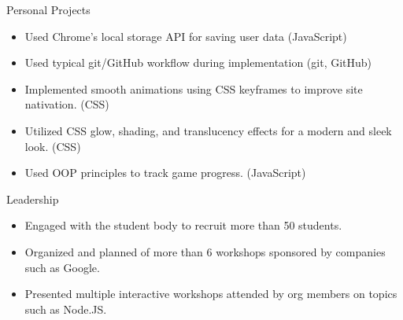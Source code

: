\documentclass{resume} %
\begin{document}
\begin{workSection}{Personal Projects}
    \customItem[
        title=To Do List Webapp,
        duration=Fall 2022,
        keyHighlight=Developed interactive to-do list webapp with local save function through vanilla HTML{,} CSS \& JS
    ]
    \begin{itemize}
        \vspace{-0.5em}
        \itemsep -6pt {}
        \item Used Chrome's local storage API for saving user data (JavaScript)
        \item Used typical git/GitHub workflow during implementation (git, GitHub)
    \end{itemize}
    \customItem[
        title=Tic Tac Toe webapp,
        duration=Fall 2022,
        keyHighlight=Minimal Tic-Tac-Toe game supporting human-human{,} human-bot{,} and bot-bot game-modes.
    ]
    \begin{itemize}
        \item Implemented smooth animations using CSS keyframes to improve site nativation. (CSS)
        \item Utilized CSS glow{,} shading{,} and translucency effects for a modern and sleek look. (CSS)
        \item Used OOP principles to track game progress. (JavaScript)
    \end{itemize}
\end{workSection}

\begin{workSection}{Leadership}
    \customItem[
        title=Association for Computing Machinery,
        keyHighlight=Multiple leadership roles{,} including publicity offier \& treasurer),
        duration=Fall 2022 - Present
    ]
    \begin{itemize}
        \vspace{-0.5em}
        \itemsep -6pt {}
        \item Engaged with the student body to recruit more than 50 students.
        \item Organized and planned of more than 6 workshops sponsored by companies such as Google. 
        \item Presented multiple interactive workshops attended by org members on topics such as Node.JS.
    \end{itemize}
\end{workSection}
\end{document}
